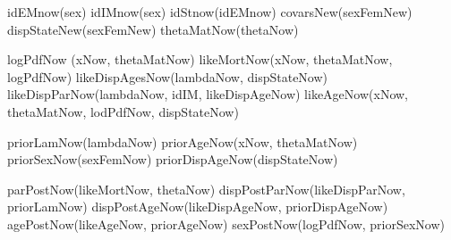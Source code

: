 
idEMnow(sex)
idIMnow(sex)
idStnow(idEMnow)
covarsNew(sexFemNew)
dispStateNew(sexFemNew)
thetaMatNow(thetaNow)

logPdfNow (xNow, thetaMatNow)
likeMortNow(xNow, thetaMatNow, logPdfNow)
likeDispAgesNow(lambdaNow, dispStateNow)
likeDispParNow(lambdaNow, idIM, likeDispAgeNow)
likeAgeNow(xNow, thetaMatNow, lodPdfNow, dispStateNow)

priorLamNow(lambdaNow)
priorAgeNow(xNow, thetaMatNow)
priorSexNow(sexFemNow)
priorDispAgeNow(dispStateNow)

parPostNow(likeMortNow, thetaNow)
dispPostParNow(likeDispParNow, priorLamNow)
dispPostAgeNow(likeDispAgeNow, priorDispAgeNow)
agePostNow(likeAgeNow, priorAgeNow)
sexPostNow(logPdfNow, priorSexNow)
